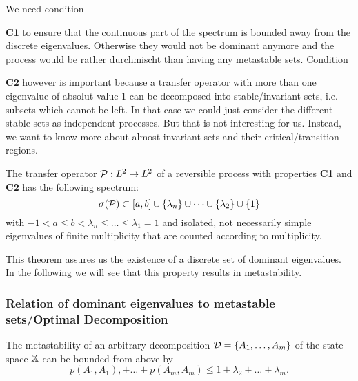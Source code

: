 We need condition {\textbf{\textsf{C1}} to ensure that the continuous part of the spectrum is bounded away from the discrete eigenvalues. Otherwise they would not be dominant anymore and the process would be rather durchmischt than having any metastable sets.
Condition {\textbf{\textsf{C2}} however is important because a transfer operator with more than one eigenvalue of absolut value $1$  can be decomposed into stable/invariant sets, i.e. subsets which cannot be left. In that case we could just consider the different stable sets as independent processes. But that is not interesting for us.  Instead, we want to know more about almost invariant sets and their critical/transition regions. 
\begin{thm}
\label{thm:metastability_bounds}
The transfer operator $\mathcal{P}: L^2 \rightarrow L^2$ of a reversible process with properties \textrm{\textbf{\textsf{C1}}} and \textrm{\textbf{\textsf{C2}}} has the following spectrum:
\begin{equation*}
\sigma(\mathcal{P}) \subset [a,b] \cup \{\lambda_n\} \cup \dots \cup \{\lambda_2 \} \cup \{1\}
\end{equation*}
with $-1 < a \leq b < \lambda_n \leq \dots \leq \lambda_1 = 1$ and isolated, not necessarily simple eigenvalues of finite multiplicity that are counted according to multiplicity. 
\end{thm}
This theorem assures us the existence of a discrete set of dominant eigenvalues. In the following we will see that this property results in metastability.

\subsubsection*{Relation of dominant eigenvalues to metastable sets/Optimal Decomposition}

\begin{thm}
\label{thm:metastability_bounds_1}
The metastability of an arbitrary decomposition $\mathcal{D} = \{A_1,\dots, A_m\}$ of the state space $\mathbb{X}$ can be bounded from above by
\begin{equation*}
p(A_1,A_1), + \dots + p(A_m, A_m) \leq 1+ \lambda_2 + \dots + \lambda_m.
\end{equation*}
\end{thm}

}}
